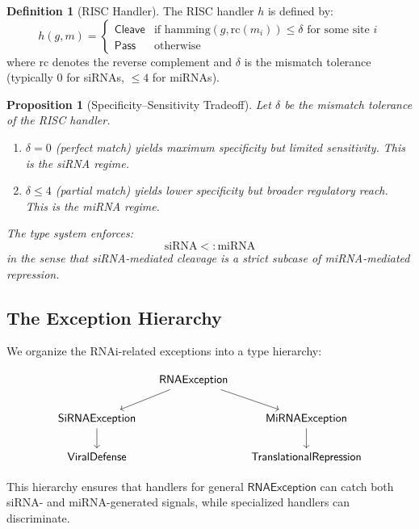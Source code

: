 \documentclass[12pt,a4paper]{article}
\newtheorem{proposition}[theorem]{Proposition}
\theoremstyle{definition}
\newtheorem{definition}[theorem]{Definition}
\begin{document}
\begin{definition}[RISC Handler]\label{def:risc-handler}
The RISC handler $h$ is defined by:
\[
  h(g, m) =
  \begin{cases}
    \mathsf{Cleave} & \text{if } \mathrm{hamming}(g, \mathrm{rc}(m_i)) \leq \delta
      \text{ for some site } i \\
    \mathsf{Pass} & \text{otherwise}
  \end{cases}
\]
where $\mathrm{rc}$ denotes the reverse complement and $\delta$ is the
mismatch tolerance (typically 0 for siRNAs, $\leq 4$ for miRNAs).
\end{definition}

\begin{proposition}[Specificity--Sensitivity Tradeoff]
Let $\delta$ be the mismatch tolerance of the RISC handler.
\begin{enumerate}[label=(\alph*)]
  \item $\delta = 0$ (perfect match) yields maximum specificity but
    limited sensitivity.  This is the siRNA regime.
  \item $\delta \leq 4$ (partial match) yields lower specificity but
    broader regulatory reach.  This is the miRNA regime.
\end{enumerate}
The type system enforces:
\[
  \text{siRNA} <: \text{miRNA}
\]
in the sense that siRNA-mediated cleavage is a \emph{strict} subcase of
miRNA-mediated repression.
\end{proposition}

\subsection{The Exception Hierarchy}

We organize the RNAi-related exceptions into a type hierarchy:

\[
\begin{tikzcd}[column sep=small]
  & \mathsf{RNAException} \arrow[dl] \arrow[dr] & \\
  \mathsf{SiRNAException} \arrow[d] & & \mathsf{MiRNAException} \arrow[d] \\
  \mathsf{ViralDefense} & & \mathsf{TranslationalRepression}
\end{tikzcd}
\]

This hierarchy ensures that handlers for general $\mathsf{RNAException}$
can catch both siRNA- and miRNA-generated signals, while specialized
handlers can discriminate.

\end{document}
